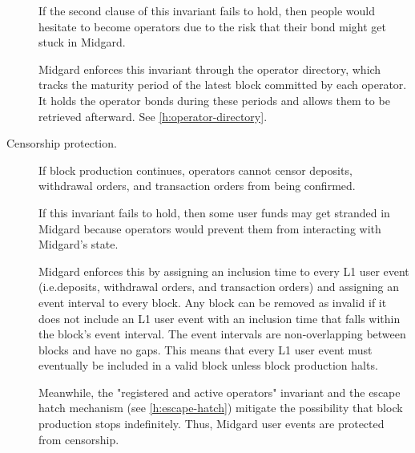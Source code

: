 \documentclass[../midgard.tex]{subfiles}
\begin{document}
\begin{description}
    If the second clause of this invariant fails to hold, then people would hesitate to become operators due to the risk that their bond might get stuck in Midgard.

    Midgard enforces this invariant through the operator directory, which tracks the maturity period of the latest block committed by each operator. It holds the operator bonds during these periods and allows them to be retrieved afterward.
    See \cref{h:operator-directory}.

  \item[Censorship protection.] If block production continues, operators cannot censor deposits, withdrawal orders, and transaction orders from being confirmed.

    If this invariant fails to hold, then some user funds may get stranded in Midgard because operators would prevent them from interacting with Midgard's state.

    Midgard enforces this by assigning an inclusion time to every L1 user event (i.e.deposits, withdrawal orders, and transaction orders) and assigning an event interval to every block.
    Any block can be removed as invalid if it does not include an L1 user event with an inclusion time that falls within the block's event interval.
    The event intervals are non-overlapping between blocks and have no gaps.
    This means that every L1 user event must eventually be included in a valid block unless block production halts.

    Meanwhile, the "registered and active operators" invariant and the escape hatch mechanism (see \cref{h:escape-hatch}) mitigate the possibility that block production stops indefinitely.
    Thus, Midgard user events are protected from censorship.
\end{description}
\end{document}
